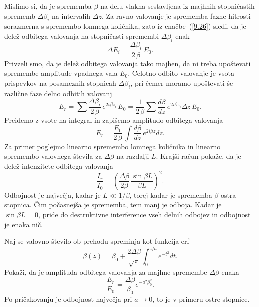 Mislimo si, da je sprememba $\beta$ na delu vlakna sestavljena iz
majhnih stopničastih sprememb $\Delta\beta_{i}$ na intervalih $\Delta z$.
Za ravno valovanje je sprememba fazne hitrosti sorazmerna s spremembo
lomnega količnika, zato iz enačbe~(\ref{9.26}) sledi, da je delež odbitega
valovanja na stopničasti spremembi $\Delta\beta_{i}$ enak
\begin{equation}
\Delta E_{i}=\frac{\Delta\beta_{i}}{2\,\beta}\, E_{0}.
\label{9.27}
\end{equation}
Privzeli smo, da je delež odbitega valovanja tako majhen, da ni treba upoštevati 
spremembe amplitude vpadnega vala $E_{0}$. Celotno odbito valovanje je vsota 
prispevkov na posameznih stopnicah $\Delta\beta_{i}$,
pri čemer moramo upoštevati še različne faze delno odbitih valovanj
\begin{equation}
E_{r}=\sum\frac{\Delta\beta_{i}}{2\,\beta}\, e^{2i\beta z_{i}}\, 
E_{0}=\frac{1}{2\,\beta}\sum\frac{d\beta}{dz}\, e^{2i\beta z_{i}}\Delta z\, E_{0}.
\label{9.28}
\end{equation}
Preidemo z vsote na integral in zapišemo amplitudo odbitega valovanja
\begin{equation}
E_{r}=\frac{E_{0}}{2\,\beta}\,\int\frac{d\beta}{dz}\, e^{2i\beta z}dz.
\label{9.29}
\end{equation}
Za primer poglejmo linearno spremembo lomnega količnika in linearno spremembo 
valovnega števila za $\Delta\beta$ na razdalji $L$. Krajši račun pokaže, da je 
delež intenzitete odbitega valovanja 
\begin{equation}
\frac{I_{r}}{I_{0}}=\left( \frac{\Delta\beta}{2 \beta}\,\frac{\sin\beta L}{\beta L}\right)^2.
\label{9.30}
\end{equation}
Odbojnost je največja, kadar je $L \ll 1/\beta$,
torej kadar je sprememba $\beta$ ostra stopnica. Čim počasnejša je
sprememba, tem manj je odboja. Kadar je $\sin\beta L=0$, pride do destruktivne 
interference vseh delnih odbojev in odbojnost je enaka nič.

\begin{definition}
Naj se valovno število ob prehodu spreminja kot funkcija erf
\begin{equation}
\beta (z)= \beta_0 + \frac{2\Delta \beta}{\sqrt{\pi}} \int_0^{z/a} e^{-t^2}dt.
\end{equation}
Pokaži, da je amplituda 
odbitega valovanja za majhne spremembe $\Delta \beta$ enaka
\begin{equation}
\frac{E_r}{E_0} = \frac{\Delta \beta}{\beta_0}e^{-a^2\beta_0^2}.
\end{equation}
Po pričakovanju je odbojnost največja pri $a\to 0$, to je v primeru ostre stopnice.
\end{definition}

